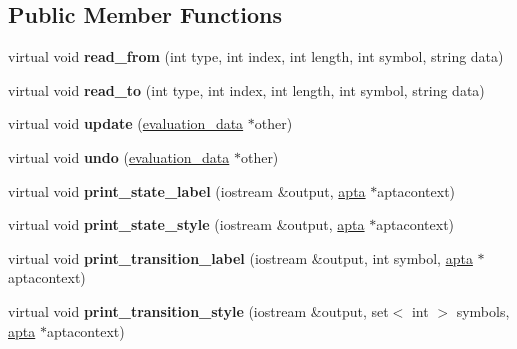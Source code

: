 \subsection*{Public Member Functions}
\begin{DoxyCompactItemize}
\item 
virtual void {\bfseries read\+\_\+from} (int type, int index, int length, int symbol, string data)\hypertarget{classevaluation__data_ad4774370fe02a3daadfe4b2aed447ac5}{}\label{classevaluation__data_ad4774370fe02a3daadfe4b2aed447ac5}

\item 
virtual void {\bfseries read\+\_\+to} (int type, int index, int length, int symbol, string data)\hypertarget{classevaluation__data_aff5dc3181ecf1391840b9193715dc229}{}\label{classevaluation__data_aff5dc3181ecf1391840b9193715dc229}

\item 
virtual void {\bfseries update} (\hyperlink{classevaluation__data}{evaluation\+\_\+data} $\ast$other)\hypertarget{classevaluation__data_a863d6fd9eb36651639f0879af3262d5c}{}\label{classevaluation__data_a863d6fd9eb36651639f0879af3262d5c}

\item 
virtual void {\bfseries undo} (\hyperlink{classevaluation__data}{evaluation\+\_\+data} $\ast$other)\hypertarget{classevaluation__data_a14974d8526bdfbf7a05a4d2f53378b0e}{}\label{classevaluation__data_a14974d8526bdfbf7a05a4d2f53378b0e}

\item 
virtual void {\bfseries print\+\_\+state\+\_\+label} (iostream \&output, \hyperlink{classapta}{apta} $\ast$aptacontext)\hypertarget{classevaluation__data_a42ec54d6111c2dc9979b679c714e03f3}{}\label{classevaluation__data_a42ec54d6111c2dc9979b679c714e03f3}

\item 
virtual void {\bfseries print\+\_\+state\+\_\+style} (iostream \&output, \hyperlink{classapta}{apta} $\ast$aptacontext)\hypertarget{classevaluation__data_a6cb73abd19dc438a0060fc675486703f}{}\label{classevaluation__data_a6cb73abd19dc438a0060fc675486703f}

\item 
virtual void {\bfseries print\+\_\+transition\+\_\+label} (iostream \&output, int symbol, \hyperlink{classapta}{apta} $\ast$aptacontext)\hypertarget{classevaluation__data_a42616b2b65dcce18c38db0198c0c6357}{}\label{classevaluation__data_a42616b2b65dcce18c38db0198c0c6357}

\item 
virtual void {\bfseries print\+\_\+transition\+\_\+style} (iostream \&output, set$<$ int $>$ symbols, \hyperlink{classapta}{apta} $\ast$aptacontext)\hypertarget{classevaluation__data_addc2c82524a7056090084c65560e13ab}{}\label{classevaluation__data_addc2c82524a7056090084c65560e13ab}


\end{DoxyCompactItemize}

